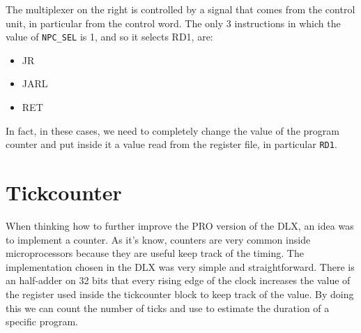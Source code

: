 The multiplexer on the right is controlled by a signal that comes from the control unit, in particular from the control word. The only 3 instructions in which the value of \texttt{NPC\_SEL} is 1, and so it selects RD1, are:

\begin{itemize}
  \item JR
  \item JARL
  \item RET
\end{itemize}

In fact, in these cases, we need to completely change the value of the program counter and put inside it a value read from the register file, in particular \texttt{RD1}.
\section{Tickcounter}
When thinking how to further improve the PRO version of the DLX, an idea was to implement a counter. As it's know, counters are very common inside microprocessors because they are useful keep track of the timing. 
The implementation chosen in the DLX was very simple and straightforward. There is an half-adder on 32 bits that every rising edge of the clock increases the value of the register used inside the tickcounter block to keep track of the value. By doing this we can count the number of ticks and use to estimate the duration of a specific program.
